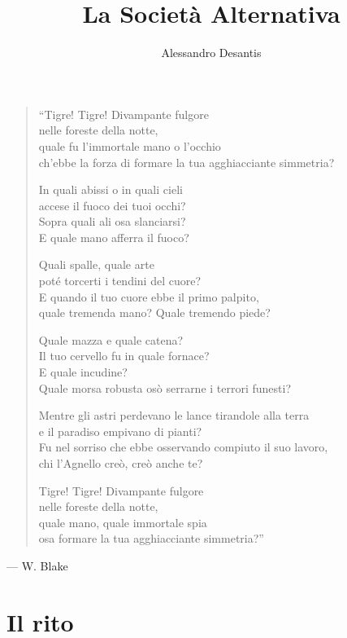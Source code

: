 \documentclass[a4paper,10pt]{memoir}
\title{La Società Alternativa}
\author{Alessandro Desantis}
\date{}
\begin{document}
\begin{titlingpage}
\maketitle
\end{titlingpage}

\clearpage
\thispagestyle{empty}

\begin{verse}
\itshape{
``Tigre! Tigre! Divampante fulgore\\
nelle foreste della notte,\\
quale fu l'immortale mano o l'occhio\\
ch'ebbe la forza di formare la tua agghiacciante simmetria?

In quali abissi o in quali cieli\\
accese il fuoco dei tuoi occhi?\\
Sopra quali ali osa slanciarsi?\\
E quale mano afferra il fuoco?

Quali spalle, quale arte\\
poté torcerti i tendini del cuore?\\
E quando il tuo cuore ebbe il primo palpito,\\
quale tremenda mano? Quale tremendo piede?

Quale mazza e quale catena?\\
Il tuo cervello fu in quale fornace?\\
E quale incudine?\\
Quale morsa robusta osò serrarne i terrori funesti?

Mentre gli astri perdevano le lance tirandole alla terra\\
e il paradiso empivano di pianti?\\
Fu nel sorriso che ebbe osservando compiuto il suo lavoro,\\
chi l'Agnello creò, creò anche te?

Tigre! Tigre! Divampante fulgore\\
nelle foreste della notte,\\
quale mano, quale immortale spia\\
osa formare la tua agghiacciante simmetria?''
\/}
\end{verse}

\begin{flushright}
--- W. Blake
\end{flushright}

\chapter{Il rito}
\end{document}
